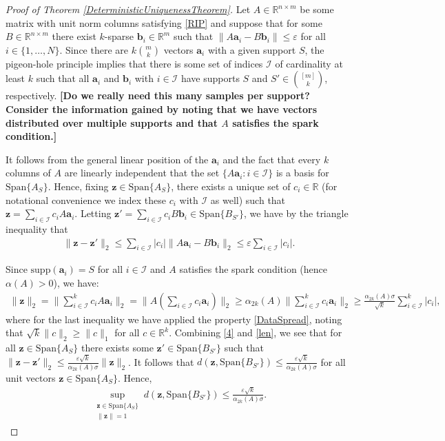 \documentclass[journal, onecolumn]{IEEEtran}
\begin{document}
\begin{proof}[Proof of Theorem \ref{DeterministicUniquenessTheorem}]
Let $A \in \mathbb{R}^{n \times m}$ be some matrix with unit norm columns satisfying \eqref{RIP} and suppose that for some $B \in \mathbb{R}^{n \times m}$ there exist $k$-sparse $\mathbf{b}_i \in \mathbb{R}^m$ such that $\|A\mathbf{a}_i - B\mathbf{b}_i\| \leq \varepsilon$ for all $i \in \{1, \ldots, N\}$. Since there are $k{m \choose k}$ vectors $\mathbf{a}_i$ with a given support $S$, the pigeon-hole principle implies that there is some set of indices $\mathcal{I}$ of cardinality at least $k$ such that all $\mathbf{a}_i$ and $\mathbf{b}_i$ with $i \in \mathcal{I}$ have supports $S$ and $S' \in {[m] \choose k}$, respectively. \textbf{[Do we really need this many samples per support? Consider the information gained by noting that we have vectors distributed over multiple supports and that $A$ satisfies the spark condition.]}

It follows from the general linear position of the $\mathbf{a}_i$ and the fact that every $k$ columns of $A$ are linearly independent that the set $\{A\mathbf{a}_i: i \in \mathcal{I}\}$ is a basis for $\text{Span}\{A_S\}$. Hence, fixing $\mathbf{z} \in \text{Span}\{A_S\}$, there exists a unique set of $c_i \in \mathbb{R}$ (for notational convenience we index these $c_i$ with $\mathcal{I}$ as well) such that $\mathbf{z} = \sum_{i \in \mathcal{I}} c_iA\mathbf{a}_i$. Letting $\mathbf{z'} = \sum_{i \in \mathcal{I}} c_iB\mathbf{b}_i \in \text{Span}\{B_{S'}\}$, we have by the triangle inequality that
\begin{align}\label{4}
\|\mathbf{z} - \mathbf{z'}\|_2
\leq \sum_{i \in \mathcal{I}} |c_i| \| A\mathbf{a}_i - B\mathbf{b}_i \|_2 \leq \varepsilon \sum_{i \in \mathcal{I}} |c_i|.
\end{align}

Since $\text{supp}(\mathbf{a}_i) = S$ for all $i \in \mathcal{I}$ and $A$ satisfies the spark condition (hence $\alpha(A) > 0$), we have:
\begin{align}\label{len}
\|\mathbf{z}\|_2 = \|\sum_{i \in \mathcal{I}}^k c_i A \mathbf{a}_i\|_2 
= \|A (\sum_{i \in \mathcal{I}} c_i \mathbf{a}_i) \|_2 
\geq \alpha_{2k}(A) \|\sum_{i \in \mathcal{I}}^k c_i \mathbf{a}_i\|_2 
\geq \frac{\alpha_{2k}(A)\sigma}{\sqrt{k}}\sum_{i \in \mathcal{I}}^k |c_i|,
\end{align}
%
where for the last inequality we have applied the property \eqref{DataSpread}, noting that $\sqrt{k}\|c\|_2 \geq \|c\|_1$ for all $c \in \mathbb{R}^k$. Combining \eqref{4} and \eqref{len}, we see that for all $\mathbf{z} \in \text{Span}\{A_S\}$ there exists some $\mathbf{z}' \in \text{Span}\{B_{S'}\}$ such that $\|\mathbf{z} - \mathbf{z}'\|_2 \leq \frac{ \varepsilon \sqrt{k}}{ \alpha_{2k}(A) \sigma } \|\mathbf{z}\|_2$. It follows that $d(\mathbf{z}, \text{Span}\{B_{S'}\}) \leq \frac{ \varepsilon \sqrt{k} }{ \alpha_{2k}(A) \sigma }$ for all unit vectors $\mathbf{z} \in \text{Span}\{A_S\}$. Hence,
\begin{align}\label{ABSubspaceDistance}
\sup_{ \substack{ \mathbf{z} \in \text{Span}\{A_{S}\} \\ \|\mathbf{z}\| = 1} } d(\mathbf{z}, \text{Span}\{B_{S'}\}) \leq \frac{ \varepsilon \sqrt{k} }{ \alpha_{2k}(A) \sigma }.
\end{align}


\end{proof}
\end{document}

